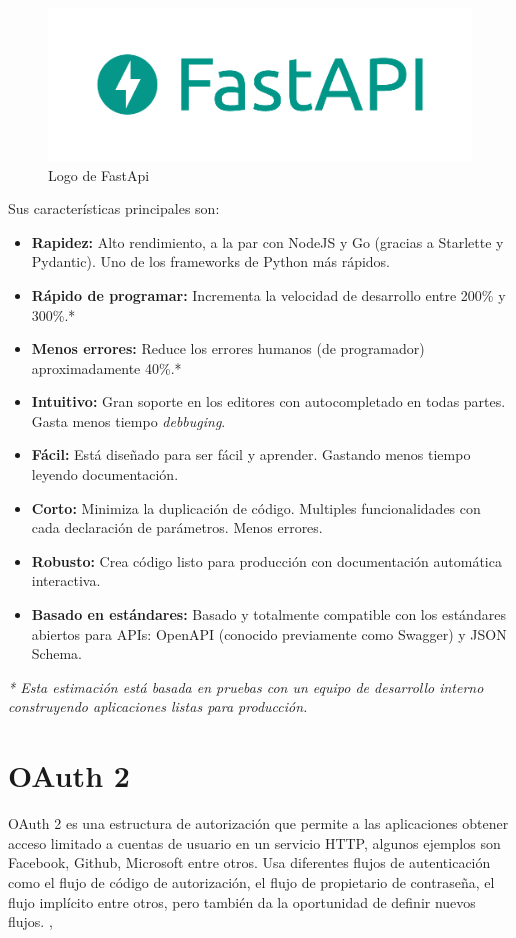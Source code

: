 \begin{figure}[!ht]
    \centering
    \includegraphics[scale=0.250]{TT/img/analisis/logofastapi.png}
    \caption{Logo de FastApi}
    \label{graphic:logoFastApi}
\end{figure}
Sus características principales son:
\begin{itemize}
    \item \textbf{Rapidez: }Alto rendimiento, a la par con NodeJS y Go (gracias a Starlette y Pydantic). Uno de los frameworks de Python más rápidos.
    \item \textbf{Rápido de programar: }Incrementa la velocidad de desarrollo entre 200\% y 300\%.*
    \item \textbf{Menos errores: }Reduce los errores humanos (de programador) aproximadamente 40\%.*
    \item \textbf{Intuitivo: }Gran soporte en los editores con autocompletado en todas partes. Gasta menos tiempo \textit{debbuging}.
    \item \textbf{Fácil: }Está diseñado para ser fácil y aprender. Gastando menos tiempo leyendo documentación.
    \item \textbf{Corto: }Minimiza la duplicación de código. Multiples funcionalidades con cada declaración de parámetros. Menos errores.
    \item \textbf{Robusto: }Crea código listo para producción con documentación automática interactiva.
    \item \textbf{Basado en estándares: }Basado y totalmente compatible con los estándares abiertos para APIs:  OpenAPI (conocido previamente como Swagger) y JSON Schema.
\end{itemize}

\textit{* Esta estimación está basada en pruebas con un equipo de desarrollo interno construyendo aplicaciones listas para producción.\cite{Ramirez2021}}

\section{OAuth 2}
OAuth 2 es una estructura de autorización que permite a las aplicaciones obtener acceso limitado a cuentas de usuario en un servicio HTTP, algunos ejemplos son Facebook, Github, Microsoft entre otros. Usa diferentes flujos de autenticación como el flujo de código de autorización, el flujo de propietario de contraseña, el flujo implícito entre otros, pero también da la oportunidad de definir nuevos flujos. \cite{Anicas2018}, \cite{Magana2020}

